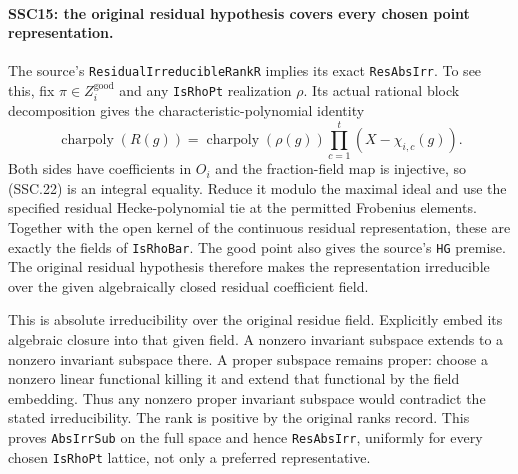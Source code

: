 \documentclass[11pt,a4paper]{article}
\numberwithin{equation}{section}
\theoremstyle{remark}\newtheorem{remark}[theorem]{Remark}
\begin{document}
\paragraph{SSC15: the original residual hypothesis covers every chosen point representation.}
\label{claim:SSC15}
The source's \texttt{Residual\allowbreak Irreducible\allowbreak Rank\allowbreak R} implies its exact
\texttt{Res\allowbreak Abs\allowbreak Irr}. To see this, fix $\pi\in Z_i^{\mathrm{good}}$
and any \texttt{Is\allowbreak Rho\allowbreak Pt} realization $\rho$. Its actual rational
block decomposition gives the characteristic-polynomial identity
\[
 \operatorname{charpoly}(R(g))
    =\operatorname{charpoly}(\rho(g))
           \prod_{c=1}^{t}(X-\chi_{i,c}(g)).                   \tag{SSC.22}
\]
Both sides have coefficients in $O_i$ and the fraction-field map
is injective, so (SSC.22) is an integral equality. Reduce it modulo
the maximal ideal and use the specified residual Hecke-polynomial
tie at the permitted Frobenius elements. Together with the open
kernel of the continuous residual representation, these are
exactly the fields of \texttt{Is\allowbreak Rho\allowbreak Bar}. The good point also gives
the source's \texttt{HG} premise. The original residual hypothesis
therefore makes the representation irreducible over the given
algebraically closed residual coefficient field.

This is absolute irreducibility over the original residue field.
Explicitly embed its algebraic closure into that given field.
A nonzero invariant subspace extends to a nonzero invariant
subspace there. A proper subspace remains proper: choose a
nonzero linear functional killing it and extend that functional
by the field embedding. Thus any nonzero proper invariant subspace
would contradict the stated irreducibility. The rank is positive
by the original ranks record. This proves \texttt{Abs\allowbreak Irr\allowbreak Sub} on the
full space and hence \texttt{Res\allowbreak Abs\allowbreak Irr}, uniformly for every chosen
\texttt{Is\allowbreak Rho\allowbreak Pt} lattice, not only a preferred representative.

\end{document}
